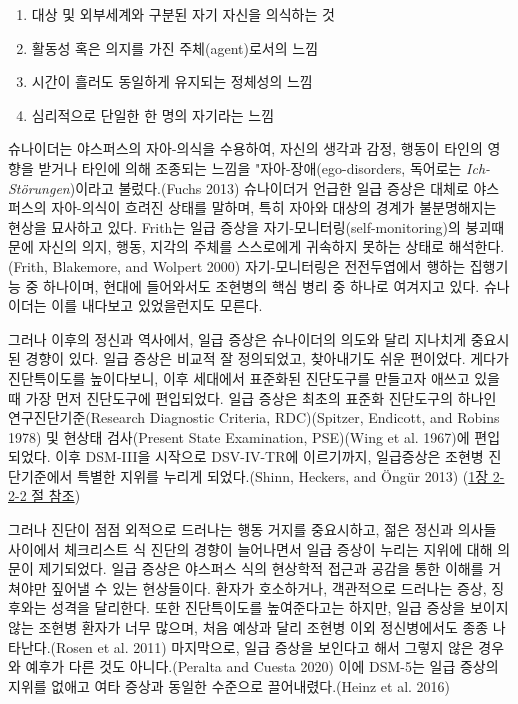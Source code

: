 \documentclass[
]{article}
\providecommand{\tightlist}{%
  \setlength{\itemsep}{0pt}\setlength{\parskip}{0pt}}
\begin{document}
\begin{enumerate}
\def\labelenumi{\arabic{enumi}.}
\tightlist
\item
  대상 및 외부세계와 구분된 자기 자신을 의식하는 것
\item
  활동성 혹은 의지를 가진 주체(agent)로서의 느낌
\item
  시간이 흘러도 동일하게 유지되는 정체성의 느낌
\item
  심리적으로 단일한 한 명의 자기라는 느낌
\end{enumerate}

슈나이더는 야스퍼스의 자아-의식을 수용하여, 자신의 생각과 감정, 행동이
타인의 영향을 받거나 타인에 의해 조종되는 느낌을
"자아-장애(ego-disorders, 독어로는 \emph{Ich-Störungen})이라고
불렀다.(Fuchs 2013) 슈나이더거 언급한 일급 증상은 대체로 야스퍼스의
자아-의식이 흐려진 상태를 말하며, 특히 자아와 대상의 경계가 불분명해지는
현상을 묘사하고 있다. Frith는 일급 증상을
자기-모니터링(self-monitoring)의 붕괴때문에 자신의 의지, 행동, 지각의
주체를 스스로에게 귀속하지 못하는 상태로 해석한다.(Frith, Blakemore, and
Wolpert 2000) 자기-모니터링은 전전두엽에서 행하는 집행기능 중 하나이며,
현대에 들어와서도 조현병의 핵심 병리 중 하나로 여겨지고 있다. 슈나이더는
이를 내다보고 있었을런지도 모른다.

그러나 이후의 정신과 역사에서, 일급 증상은 슈나이더의 의도와 달리
지나치게 중요시된 경향이 있다. 일급 증상은 비교적 잘 정의되었고,
찾아내기도 쉬운 편이었다. 게다가 진단특이도를 높이다보니, 이후 세대에서
표준화된 진단도구를 만들고자 애쓰고 있을 때 가장 먼저 진단도구에
편입되었다. 일급 증상은 최초의 표준화 진단도구의 하나인
연구진단기준(Research Diagnostic Criteria, RDC)(Spitzer, Endicott, and
Robins 1978) 및 현상태 검사(Present State Examination, PSE)(Wing et al.
1967)\textbf{\hspace{0pt}}에 편입되었다. 이후 DSM-III을 시작으로
DSV-IV-TR에 이르기까지, 일급증상은 조현병 진단기준에서 특별한 지위를
누리게 되었다.(Shinn, Heckers, and Öngür 2013) (\href{}{1장 2-2-2 절
참조})

그러나 진단이 점점 외적으로 드러나는 행동 거지를 중요시하고, 젊은 정신과
의사들 사이에서 체크리스트 식 진단의 경향이 늘어나면서 일급 증상이
누리는 지위에 대해 의문이 제기되었다. 일급 증상은 야스퍼스 식의 현상학적
접근과 공감을 통한 이해를 거쳐야만 짚어낼 수 있는 현상들이다. 환자가
호소하거나, 객관적으로 드러나는 증상, 징후와는 성격을 달리한다. 또한
진단특이도를 높여준다고는 하지만, 일급 증상을 보이지 않는 조현병 환자가
너무 많으며, 처음 예상과 달리 조현병 이외 정신병에서도 종종
나타난다.(Rosen et al. 2011) 마지막으로, 일급 증상을 보인다고 해서
그렇지 않은 경우와 예후가 다른 것도 아니다.(Peralta and Cuesta 2020)
이에 DSM-5는 일급 증상의 지위를 없애고 여타 증상과 동일한 수준으로
끌어내렸다.(Heinz et al. 2016)
\end{document}
